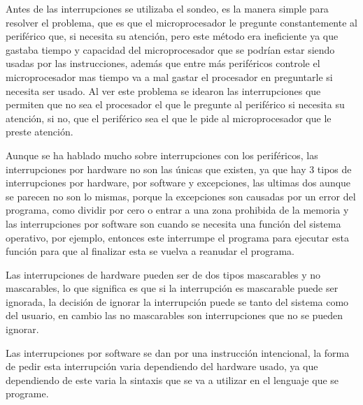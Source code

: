 \documentclass[12pt]{article}
\begin{document}
\large
Antes de las interrupciones se utilizaba el sondeo, es la manera simple para resolver el problema, que es que el microprocesador le pregunte constantemente al periférico que, si necesita su atención, pero este método era ineficiente ya que gastaba tiempo y capacidad del microprocesador que se podrían estar siendo usadas por las instrucciones, además que entre más periféricos controle el microprocesador mas tiempo va a mal gastar el procesador en preguntarle si necesita ser usado. Al ver este problema se idearon las interrupciones que permiten que no sea el procesador el que le pregunte al periférico si necesita su atención, si no, que el periférico sea el que le pide al microprocesador que le preste atención.\cite{interruptsmadeeasy}

\vspace{10}

\large
Aunque se ha hablado mucho sobre interrupciones con los periféricos, las interrupciones por hardware no son las únicas que existen, ya que hay 3 tipos de interrupciones por hardware, por software y excepciones, las ultimas dos aunque se parecen no son lo mismas, porque la excepciones son causadas por un error del programa, como dividir por cero o entrar a una zona prohibida de la memoria y las interrupciones por software son cuando se necesita una función del sistema operativo, por ejemplo, entonces este interrumpe el programa para ejecutar esta función para que al finalizar esta se vuelva a reanudar el programa.\cite{microprocesadoresUNAD}

\large
Las interrupciones de hardware pueden ser de dos tipos mascarables y no mascarables, lo que significa es que si la interrupción es mascarable puede ser ignorada, la decisión de ignorar la interrupción puede se tanto del sistema como del usuario, en cambio las no mascarables son interrupciones que no se pueden ignorar.

\vspace{10}

\large
Las interrupciones por software se dan por una instrucción intencional, la forma de pedir esta interrupción varia dependiendo del hardware usado, ya que dependiendo de este varia la sintaxis que se va a utilizar en el lenguaje que se programe.


\newpage

 


\end{document}
